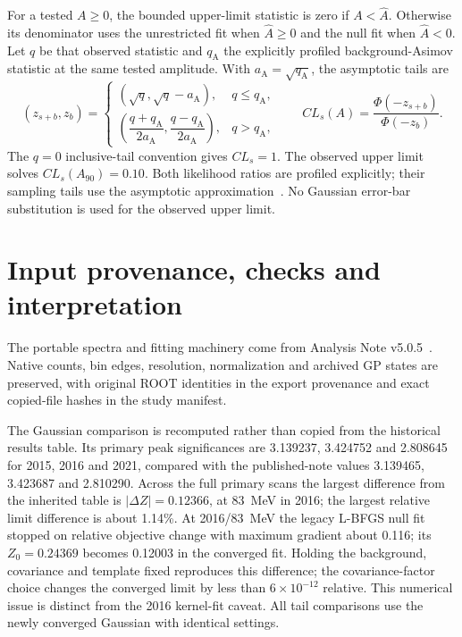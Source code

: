 \documentclass[11pt]{article}
\begin{document}
For a tested $A\geq0$, the bounded upper-limit statistic is zero if
$A<\widehat A$. Otherwise its denominator uses the unrestricted fit
when $\widehat A\geq0$ and the null fit when $\widehat A<0$.
Let $q$ be that observed statistic and $q_{\mathrm A}$ the explicitly
profiled background-Asimov statistic at the same tested amplitude.
With $a_{\mathrm A}=\sqrt{q_{\mathrm A}}$, the asymptotic tails are
\begin{equation}
 (z_{s+b},z_b)=
 \begin{cases}
 (\sqrt q,\sqrt q-a_{\mathrm A}),&q\leq q_{\mathrm A},\\[2pt]
 \left(\dfrac{q+q_{\mathrm A}}{2a_{\mathrm A}},
       \dfrac{q-q_{\mathrm A}}{2a_{\mathrm A}}\right),&q>q_{\mathrm A},
 \end{cases}
 \qquad
 CL_s(A)=\frac{\Phi(-z_{s+b})}{\Phi(-z_b)}.
\end{equation}
The $q=0$ inclusive-tail convention gives $CL_s=1$. The observed
upper limit solves $CL_s(A_{90})=0.10$. Both likelihood ratios are
profiled explicitly; their sampling tails use the asymptotic
approximation~\cite{Cowan2011}. No Gaussian error-bar substitution is
used for the observed upper limit.

\clearpage
\section{Input provenance, checks and interpretation}
The portable spectra and fitting machinery come from Analysis Note
v5.0.5~\cite{HPSv505}. Native counts, bin edges, resolution, normalization
and archived GP states are preserved, with original ROOT identities in
the export provenance and exact copied-file hashes in the study manifest.

The Gaussian comparison is recomputed rather than copied from the
historical results table. Its primary peak significances are 3.139237,
3.424752 and 2.808645 for 2015, 2016 and 2021, compared with the
published-note values 3.139465, 3.423687 and 2.810290. Across the full
primary scans the largest difference from the inherited table is
$|\Delta Z|=0.12366$, at 83~MeV in 2016; the largest relative limit
difference is about 1.14\%. At 2016/83~MeV the legacy L-BFGS null fit
stopped on relative objective change with maximum gradient about 0.116;
its $Z_0=0.24369$ becomes 0.12003 in the converged fit. Holding the
background, covariance and template fixed reproduces this difference;
the covariance-factor choice changes the converged limit by less than
$6\times10^{-12}$ relative. This numerical issue is distinct from the
2016 kernel-fit caveat. All tail comparisons use the newly converged
Gaussian with identical settings.
\end{document}
